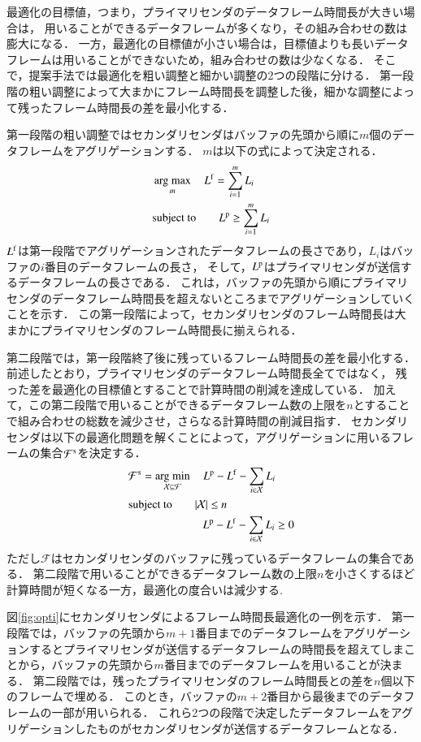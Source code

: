 \documentclass[master]{kuisthesis}		%
\newcommand{\argmax}{\mathop{\rm arg~max}\limits}
\newcommand{\argmin}{\mathop{\rm arg~min}\limits}
\begin{document}
		最適化の目標値，つまり，プライマリセンダのデータフレーム時間長が大きい場合は，
		用いることができるデータフレームが多くなり，その組み合わせの数は膨大になる．
		一方，最適化の目標値が小さい場合は，目標値よりも長いデータフレームは用いることができないため，組み合わせの数は少なくなる．
		そこで，提案手法では最適化を粗い調整と細かい調整の2つの段階に分ける．
		第一段階の粗い調整によって大まかにフレーム時間長を調整した後，細かな調整によって残ったフレーム時間長の差を最小化する．
		\par
		第一段階の粗い調整ではセカンダリセンダはバッファの先頭から順に$m$個のデータフレームをアグリゲーションする．
		$m$は以下の式によって決定される．
		\begin{align}
			&\argmax_m\quad L^{\rm f} = \sum_{i = 1}^{m} L_i \\
			&{\rm subject \ to} \qquad  L^{\rm p} \geq \sum_{i = 1}^{m} L_i
		\end{align}
		$L^{\rm f}$は第一段階でアグリゲーションされたデータフレームの長さであり，$L_i$はバッファの$i$番目のデータフレームの長さ，
		そして，$L^{\rm p}$はプライマリセンダが送信するデータフレームの長さである．
		これは，バッファの先頭から順にプライマリセンダのデータフレーム時間長を超えないところまでアグリゲーションしていくことを示す．
		この第一段階によって，セカンダリセンダのフレーム時間長は大まかにプライマリセンダのフレーム時間長に揃えられる．
		\par
		第二段階では，第一段階終了後に残っているフレーム時間長の差を最小化する．
		前述したとおり，プライマリセンダのデータフレーム時間長全てではなく，
		残った差を最適化の目標値とすることで計算時間の削減を達成している．
		加えて，この第二段階で用いることができるデータフレーム数の上限を$n$とすることで組み合わせの総数を減少させ，さらなる計算時間の削減目指す．
		セカンダリセンダは以下の最適化問題を解くことによって，アグリゲーションに用いるフレームの集合${\mathcal F}^{\rm s}$を決定する．
		\begin{align}
			&{\mathcal F}^{\rm s} = \argmin_{{\mathcal X} \subseteq {\mathcal F}}\quad L^{\rm p} - L^{\rm f} - \sum_{i \in {\mathcal X}}L_{i} \\
			&{\rm subject \ to} \qquad |{\mathcal X}| \leq n \\
			&\;\;\qquad\qquad\qquad L^{\rm p} - L^{\rm f} - \sum_{i \in {\mathcal X}} L_{i} \geq 0
		\end{align}
		ただし${\mathcal F}$はセカンダリセンダのバッファに残っているデータフレームの集合である．
		第二段階で用いることができるデータフレーム数の上限$n$を小さくするほど計算時間が短くなる一方，最適化の度合いは減少する.
		\par
		図\ref{fig:opti}にセカンダリセンダによるフレーム時間長最適化の一例を示す．
		第一段階では，バッファの先頭から$m+1$番目までのデータフレームをアグリゲーションするとプライマリセンダが送信するデータフレームの時間長を超えてしまことから，バッファの先頭から$m$番目までのデータフレームを用いることが決まる．
		第二段階では，残ったプライマリセンダのフレーム時間長との差を$n$個以下のフレームで埋める．
		このとき，バッファの$m+2$番目から最後までのデータフレームの一部が用いられる．
		これら2つの段階で決定したデータフレームをアグリゲーションしたものがセカンダリセンダが送信するデータフレームとなる．
		\par
\end{document}

